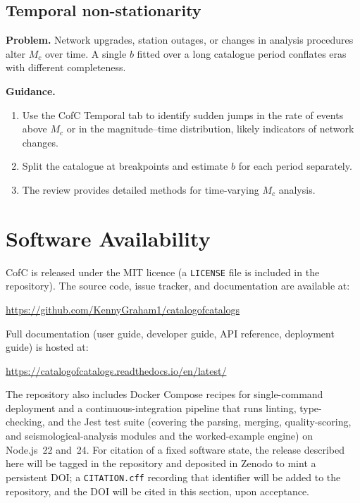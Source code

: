 \documentclass[12pt]{article}
\begin{document}
\subsection{Temporal non-stationarity}

\textbf{Problem.}  Network upgrades, station outages, or changes in analysis
procedures alter $M_c$ over time.  A single $b$ fitted over a long catalogue
period conflates eras with different completeness.

\textbf{Guidance.}
\begin{enumerate}[leftmargin=*]
  \item Use the CofC Temporal tab to identify sudden jumps in the rate of events
    above $M_c$ or in the magnitude--time distribution, likely indicators of
    network changes.
  \item Split the catalogue at breakpoints and estimate $b$ for each period
    separately.
  \item The \citet{mignan2012} review provides detailed methods for
    time-varying $M_c$ analysis.
\end{enumerate}

\section{Software Availability}
\label{sec:software}

CofC is released under the MIT licence (a \texttt{LICENSE} file is included in
the repository).  The source code, issue
tracker, and documentation are available at:
\begin{center}
  \url{https://github.com/KennyGraham1/catalogofcatalogs}
\end{center}
Full documentation (user guide, developer guide, API reference, deployment
guide) is hosted at:
\begin{center}
  \url{https://catalogofcatalogs.readthedocs.io/en/latest/}
\end{center}
The repository also includes Docker Compose recipes for single-command
deployment and a continuous-integration pipeline that runs linting,
type-checking, and the Jest test suite (covering the parsing, merging,
quality-scoring, and seismological-analysis modules and the worked-example
engine) on Node.js~22 and~24.  For citation of a fixed software state, the
release described here will be tagged in the repository and deposited in Zenodo
to mint a persistent DOI; a \texttt{CITATION.cff} recording that identifier will
be added to the repository, and the DOI will be cited in this section, upon
acceptance.
\end{document}
